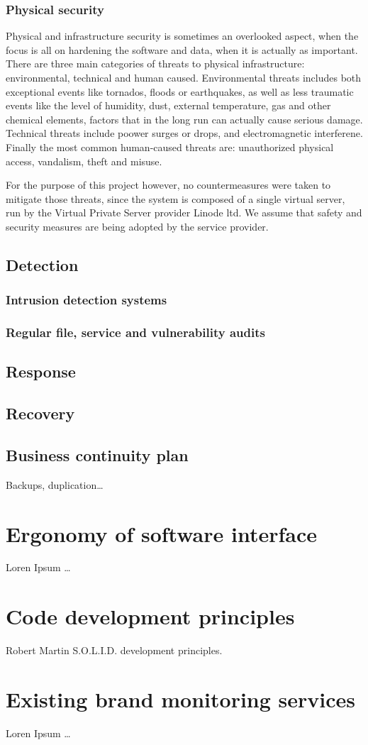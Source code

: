 \subsubsection{Physical security}
Physical and infrastructure security is sometimes an overlooked aspect, when the
focus is all on hardening the software and data, when it is actually as
important. There are three main categories of threats to physical
infrastructure: environmental, technical and human caused. Environmental threats
includes both exceptional events like tornados, floods or earthquakes, as well
as less traumatic events like the level of humidity, dust, external temperature, gas
and other chemical elements, factors that in the long run can actually cause
serious damage. Technical threats include poower surges or drops, and
electromagnetic interferene. Finally the most common human-caused threats are:
unauthorized physical access, vandalism, theft and misuse.

For the purpose of this project however, no countermeasures were taken to
mitigate those threats, since the system is composed of a single virtual server,
run by the Virtual Private Server provider Linode ltd. We assume that safety and
security measures are being adopted by the service provider.

\subsection{Detection}

\subsubsection{Intrusion detection systems}

\subsubsection{Regular file, service and vulnerability audits}

\subsection{Response}

\subsection{Recovery}

\subsection{Business continuity plan}
Backups, duplication\ldots



\section{Ergonomy of software interface}
Loren Ipsum \ldots

\section{Code development principles}
Robert Martin S.O.L.I.D. development principles.

\section{Existing brand monitoring services}
Loren Ipsum \ldots